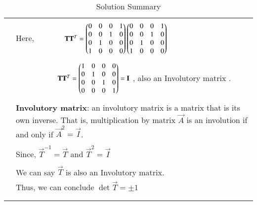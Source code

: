 \documentclass[journal,12pt]{IEEEtran}
\begin{document}
\begin{longtable}{|p{5cm}|p{13cm}|}
	&\\
	& Here, $\qquad\qquad\mathbf{T}\mathbf{T}^{T}=\begin{pmatrix}0&0&0&1\\0&0&1&0\\0&1&0&0\\1&0&0&0\end{pmatrix}\begin{pmatrix}0&0&0&1\\0&0&1&0\\0&1&0&0\\1&0&0&0\end{pmatrix}$\\
	&\\
	&$\qquad\qquad\qquad\mathbf{T}\mathbf{T}^{T}=\begin{pmatrix}1&0&0&0\\0&1&0&0\\0&0&1&0\\0&0&0&1\end{pmatrix} = \mathbf{I}$ , also an Involutory matrix .\\
	&\\
	& \textbf{Involutory matrix}: an involutory matrix is a matrix that is its own inverse. That is, multiplication by matrix $\vec{A}$ is an involution if and only if $\vec{A}^{2}=\vec{I}$.\\
	&\\
	& Since, $\vec{T}^{-1}=\vec{T}$ and $\vec{T}^2=\vec{I}$\\
	&\\
	& We can say $\vec{T}$ is also an Involutory matrix.\\
	& Thus, we can conclude $\det{\vec{T}}=\pm1$\\
	&\\
	\hline
	\caption{Solution Summary}
    \label{table:2}
\end{longtable}
\end{document}
